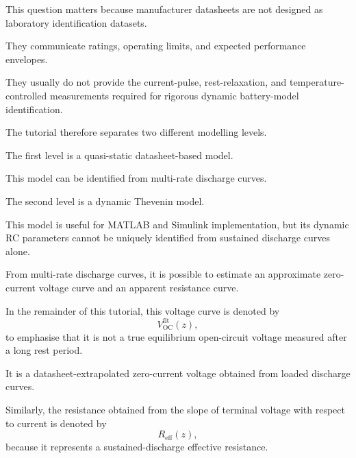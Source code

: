 \documentclass[a4paper,12pt]{article}
\begin{document}
This question matters because manufacturer datasheets are not designed as laboratory identification datasets.

They communicate ratings, operating limits, and expected performance envelopes.

They usually do not provide the current-pulse, rest-relaxation, and temperature-controlled measurements required for rigorous dynamic battery-model identification.

The tutorial therefore separates two different modelling levels.

The first level is a quasi-static datasheet-based model.

This model can be identified from multi-rate discharge curves.

The second level is a dynamic Thevenin model.

This model is useful for MATLAB and Simulink implementation, but its dynamic RC parameters cannot be uniquely identified from sustained discharge curves alone.

\begin{center}
\end{center}

From multi-rate discharge curves, it is possible to estimate an approximate zero-current voltage curve and an apparent resistance curve.

In the remainder of this tutorial, this voltage curve is denoted by
\[
V_{\mathrm{OC}}^{\mathrm{fit}}(z),
\]
to emphasise that it is not a true equilibrium open-circuit voltage measured after a long rest period.

It is a datasheet-extrapolated zero-current voltage obtained from loaded discharge curves.

Similarly, the resistance obtained from the slope of terminal voltage with respect to current is denoted by
\[
R_{\mathrm{eff}}(z),
\]
because it represents a sustained-discharge effective resistance.
\end{document}
